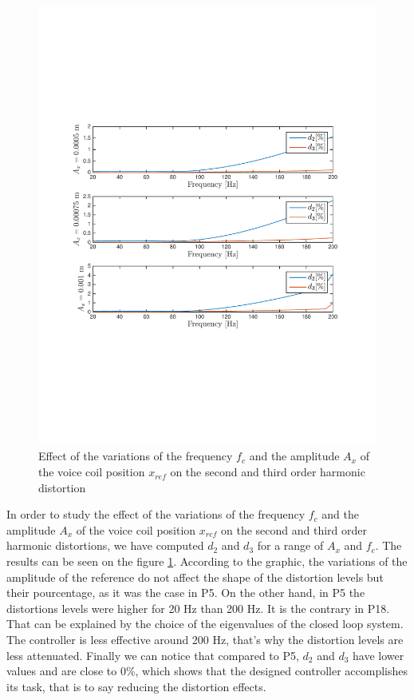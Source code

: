 \begin{figure}[H]
 \centering 
 \includegraphics[trim=2cm 7cm 2cm 7cm, clip=true, totalheight=0.35\textheight, angle=0]{figures/P18d2d3.pdf}
 \caption{Effect of the variations of the frequency $f_c$ and the amplitude $A_x$ of the voice coil position $x_{ref}$ on the second and third order harmonic distortion}
 \label{fig:d2d3P18}
\end{figure}

In order to study the effect of the variations of the frequency $f_c$ and the amplitude $A_x$ of the voice coil position $x_{ref}$ on the second and third order harmonic distortions, we have computed $d_2$ and $d_3$ for a range of $A_x$ and $f_c$. The results can be seen on the figure \ref{fig:d2d3P18}. According to the graphic, the variations of the amplitude of the reference do not affect the shape of the distortion levels but their pourcentage, as it was the case in P5. On the other hand, in P5 the distortions levels were higher for 20 Hz than 200 Hz. It is the contrary in P18. That can be explained by the choice of the eigenvalues of the closed loop system. The controller is less effective around 200 Hz, that's why the distortion levels are less attenuated. Finally we can notice that compared to P5, $d_2$ and $d_3$ have lower values and are close to 0\%, which shows that the designed controller accomplishes its task, that is to say reducing the distortion effects.